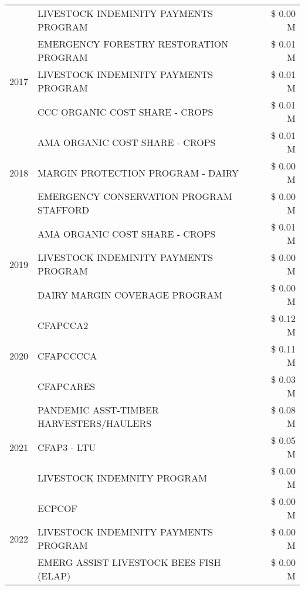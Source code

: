 \begin{tabular}{llr}
 & LIVESTOCK INDEMINITY PAYMENTS PROGRAM & \$ 0.00 M \\
\cline{1-3}
\multirow[t]{3}{*}{2017} & EMERGENCY FORESTRY RESTORATION PROGRAM & \$ 0.01 M \\
 & LIVESTOCK INDEMINITY PAYMENTS PROGRAM & \$ 0.01 M \\
 & CCC ORGANIC COST SHARE - CROPS & \$ 0.01 M \\
\cline{1-3}
\multirow[t]{3}{*}{2018} & AMA ORGANIC COST SHARE - CROPS & \$ 0.01 M \\
 & MARGIN PROTECTION PROGRAM - DAIRY & \$ 0.00 M \\
 & EMERGENCY CONSERVATION PROGRAM STAFFORD & \$ 0.00 M \\
\cline{1-3}
\multirow[t]{3}{*}{2019} & AMA ORGANIC COST SHARE - CROPS & \$ 0.01 M \\
 & LIVESTOCK INDEMINITY PAYMENTS PROGRAM & \$ 0.00 M \\
 & DAIRY MARGIN COVERAGE PROGRAM & \$ 0.00 M \\
\cline{1-3}
\multirow[t]{3}{*}{2020} & CFAPCCA2 & \$ 0.12 M \\
 & CFAPCCCCA & \$ 0.11 M \\
 & CFAPCARES & \$ 0.03 M \\
\cline{1-3}
\multirow[t]{3}{*}{2021} & PANDEMIC ASST-TIMBER HARVESTERS/HAULERS & \$ 0.08 M \\
 & CFAP3 - LTU & \$ 0.05 M \\
 & LIVESTOCK INDEMNITY PROGRAM & \$ 0.00 M \\
\cline{1-3}
\multirow[t]{3}{*}{2022} & ECPCOF & \$ 0.00 M \\
 & LIVESTOCK INDEMINITY PAYMENTS PROGRAM & \$ 0.00 M \\
 & EMERG ASSIST LIVESTOCK BEES FISH (ELAP) & \$ 0.00 M \\
\cline{1-3}
\bottomrule
\end{tabular}
